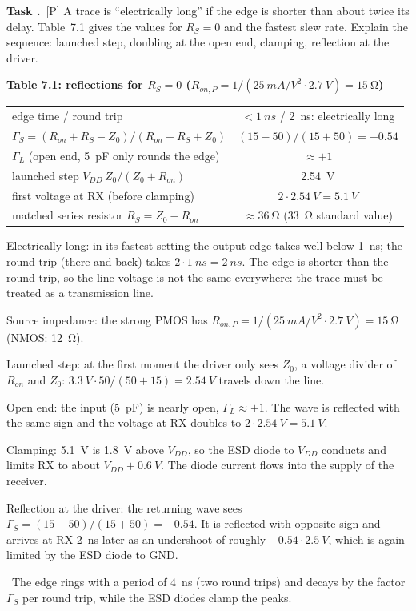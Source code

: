 \documentclass[a4paper,11pt]{article}
\newcounter{task}[section]
\renewcommand{\thetask}{\thesection.\arabic{task}}
\newcommand{\task}[1]{\par\medskip\refstepcounter{task}%
  {\sffamily\bfseries\color{rwuviolet}Task \thetask}\ {\sffamily\small\color{rwucyandark}[#1]}\quad}
\newenvironment{solution}{\begin{solbox}}{\end{solbox}}
\newcommand{\answer}{\par\smallskip{\sffamily\bfseries\color{rwuviolet}Answer:}\ }
\newenvironment{results}[2]{\par\smallskip\begin{center}\small\sffamily
  {\color{rwucyandark}\bfseries #1}\\[1mm]\renewcommand{\arraystretch}{1.25}\begin{tabular}{#2}\toprule}
  {\bottomrule\end{tabular}\end{center}}
\begin{document}
\task{P} A trace is ``electrically long'' if the edge is shorter than about twice its delay. Table~7.1 gives the
values for $R_S=0$ and the fastest slew rate. Explain the sequence: launched step, doubling at the open end,
clamping, reflection at the driver.

\begin{results}{Table 7.1: reflections for $R_S=0$ ($R_{on,P}=1/(\SI{25}{mA/V^2}\cdot\SI{2.7}{V})=\SI{15}{\ohm}$)}{lc}
  edge time / round trip & $<\SI{1}{ns}$ / \SI{2}{ns}: electrically long\\
  $\Gamma_S=(R_{on}+R_S-Z_0)/(R_{on}+R_S+Z_0)$ & $(15-50)/(15+50)=-0.54$\\
  $\Gamma_L$ (open end, \SI{5}{pF} only rounds the edge) & $\approx+1$\\
  launched step $V_{DD}\,Z_0/(Z_0+R_{on})$ & \SI{2.54}{V}\\
  first voltage at RX (before clamping) & $2\cdot\SI{2.54}{V}=\SI{5.1}{V}$\\
  matched series resistor $R_S=Z_0-R_{on}$ & $\approx\SI{36}{\ohm}$ (\SI{33}{\ohm} standard value)\\
\end{results}

\begin{solution}
\begin{steps}
  \item Electrically long: in its fastest setting the output edge takes well below \SI{1}{ns}; the round trip
        (there and back) takes $2\cdot\SI{1}{ns}=\SI{2}{ns}$. The edge is shorter than the round trip, so the
        line voltage is not the same everywhere: the trace must be treated as a transmission line.
  \item Source impedance: the strong PMOS has $R_{on,P}=1/(\SI{25}{mA/V^2}\cdot\SI{2.7}{V})=\SI{15}{\ohm}$
        (NMOS: \SI{12}{\ohm}).
  \item Launched step: at the first moment the driver only sees $Z_0$, a voltage divider of $R_{on}$ and $Z_0$:
        $\SI{3.3}{V}\cdot50/(50+15)=\SI{2.54}{V}$ travels down the line.
  \item Open end: the input (\SI{5}{pF}) is nearly open, $\Gamma_L\approx+1$. The wave is reflected with the same
        sign and the voltage at RX doubles to $2\cdot\SI{2.54}{V}=\SI{5.1}{V}$.
  \item Clamping: \SI{5.1}{V} is \SI{1.8}{V} above $V_{DD}$, so the ESD diode to $V_{DD}$ conducts and limits RX
        to about $V_{DD}+\SI{0.6}{V}$. The diode current flows into the supply of the receiver.
  \item Reflection at the driver: the returning wave sees $\Gamma_S=(15-50)/(15+50)=-0.54$. It is reflected with
        opposite sign and arrives at RX \SI{2}{ns} later as an undershoot of roughly $-0.54\cdot\SI{2.5}{V}$, which
        is again limited by the ESD diode to GND.
\end{steps}
\answer The edge rings with a period of \SI{4}{ns} (two round trips) and decays by the factor $\Gamma_S$ per
round trip, while the ESD diodes clamp the peaks.
\end{solution}
\end{document}
